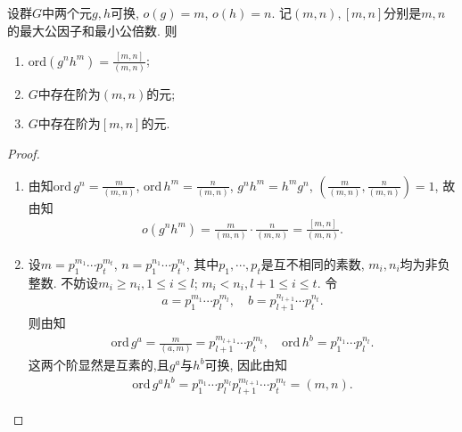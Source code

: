 \documentclass[../../main.tex]{subfiles}%
\begin{document}
\begin{example}
设群$G$中两个元$g, h$可换, $o(g)=m$, $o(h)=n$. 记$(m,n), [m,n]$分别是$m,n$的最大公因子和最小公倍数. 则
\begin{enumerate}[(1)]
\item $\text{ord}(g^n h^m)=\frac{[m,n]}{(m,n)}$;

\item $G$中存在阶为$(m,n)$的元;

\item $G$中存在阶为$[m,n]$的元.
\end{enumerate}
\end{example}
\begin{proof}
\begin{enumerate}[(1)]
\item 由知$\text{ord}\,g^n=\frac{m}{(m,n)}$, $\text{ord}\,h^m=\frac{n}{(m,n)}$, $g^n h^m = h^m g^n$, $\left(\frac{m}{(m,n)}, \frac{n}{(m,n)}\right)=1$, 故由知
\begin{align*}
o(g^n h^m)=\frac{m}{(m,n)} \cdot \frac{n}{(m,n)}=\frac{[m,n]}{(m,n)}.
\end{align*}

\item 设$m=p_1^{m_1}\cdots p_t^{m_t}$, $n=p_1^{n_1}\cdots p_t^{n_t}$, 其中$p_1,\cdots,p_t$是互不相同的素数, $m_i, n_i$均为非负整数. 不妨设$m_i \geqslant n_i, 1 \leqslant i \leqslant l$; $m_i < n_i, l+1 \leqslant i \leqslant t$. 令
\begin{align*}
a=p_1^{m_1}\cdots p_l^{m_l}, \quad b=p_{l+1}^{n_{l+1}}\cdots p_t^{n_t}.
\end{align*}
则由知
\begin{align*}
\mathrm{ord}\,g^a=\frac{m}{\left( a,m \right)}=p_{l+1}^{m_{l+1}}\cdots p_{t}^{m_t},\quad \mathrm{ord}\,h^b=p_{1}^{n_1}\cdots p_{l}^{n_l}.
\end{align*}
这两个阶显然是互素的,且$g^a$与$h^b$可换, 因此由知
\begin{align*}
\mathrm{ord}\,g^ah^b =p_1^{n_1}\cdots p_l^{n_l} p_{l+1}^{m_{l+1}}\cdots p_t^{m_t} = (m,n).
\end{align*}


\end{enumerate}
\end{proof}
\end{document}
